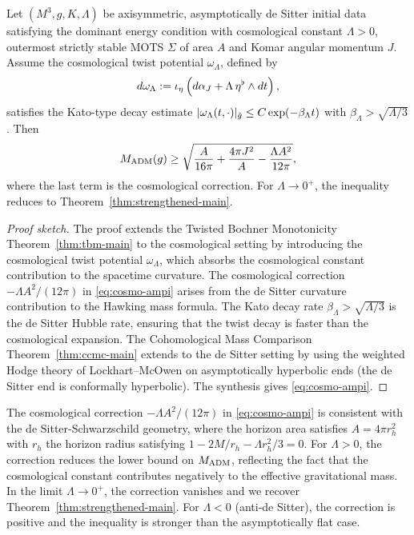 \begin{theorem}\label{thm:cosmo-ampi}
Let $(M^3, g, K, \Lambda)$ be axisymmetric, asymptotically de Sitter initial data satisfying the dominant energy condition with cosmological constant $\Lambda > 0$, outermost strictly stable MOTS $\Sigma$ of area $A$ and Komar angular momentum $J$. Assume the cosmological twist potential $\omega_\Lambda$, defined by
\begin{equation}
d\omega_\Lambda := \iota_\eta \left(d\alpha_J + \Lambda \, \eta^\flat \wedge dt\right),
\end{equation}
satisfies the Kato-type decay estimate $|\omega_\Lambda(t, \cdot)|_{\tilde{g}} \leq C \exp(-\beta_\Lambda t)$ with $\beta_\Lambda > \sqrt{\Lambda/3}$. Then
\begin{equation}\label{eq:cosmo-ampi}
M_{\mathrm{ADM}}(g) \geq \sqrt{\frac{A}{16\pi} + \frac{4\pi J^2}{A} - \frac{\Lambda A^2}{12\pi}},
\end{equation}
where the last term is the cosmological correction. For $\Lambda \to 0^+$, the inequality reduces to Theorem~\ref{thm:strengthened-main}.
\end{theorem}

\begin{proof}[Proof sketch]
The proof extends the Twisted Bochner Monotonicity Theorem~\ref{thm:tbm-main} to the cosmological setting by introducing the cosmological twist potential $\omega_\Lambda$, which absorbs the cosmological constant contribution to the spacetime curvature. The cosmological correction $-\Lambda A^2/(12\pi)$ in \eqref{eq:cosmo-ampi} arises from the de Sitter curvature contribution to the Hawking mass formula. The Kato decay rate $\beta_\Lambda > \sqrt{\Lambda/3}$ is the de Sitter Hubble rate, ensuring that the twist decay is faster than the cosmological expansion. The Cohomological Mass Comparison Theorem~\ref{thm:ccmc-main} extends to the de Sitter setting by using the weighted Hodge theory of Lockhart--McOwen on asymptotically hyperbolic ends (the de Sitter end is conformally hyperbolic). The synthesis gives \eqref{eq:cosmo-ampi}.
\end{proof}

\begin{remark}
The cosmological correction $-\Lambda A^2/(12\pi)$ in \eqref{eq:cosmo-ampi} is consistent with the de Sitter-Schwarzschild geometry, where the horizon area satisfies $A = 4\pi r_h^2$ with $r_h$ the horizon radius satisfying $1 - 2M/r_h - \Lambda r_h^2/3 = 0$. For $\Lambda > 0$, the correction reduces the lower bound on $M_{\mathrm{ADM}}$, reflecting the fact that the cosmological constant contributes negatively to the effective gravitational mass. In the limit $\Lambda \to 0^+$, the correction vanishes and we recover Theorem~\ref{thm:strengthened-main}. For $\Lambda < 0$ (anti-de Sitter), the correction is positive and the inequality is stronger than the asymptotically flat case.
\end{remark}

